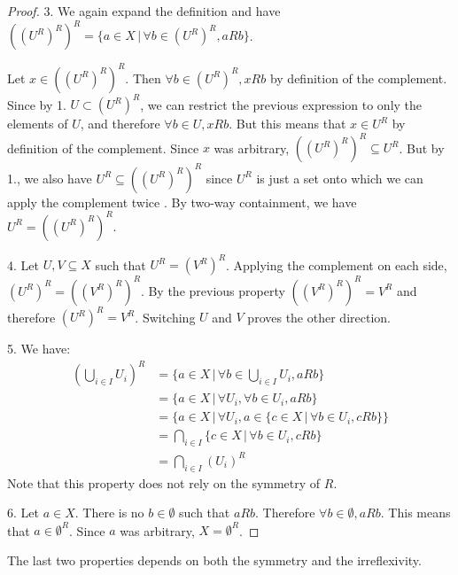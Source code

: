 \begin{mathSection}
\begin{proof}
		3. We again expand the definition and have $((U^{R})^{R})^{R} = \{ a \in X \, | \, \forall b \in (U^{R})^{R}, aRb \}$.
		
		Let $x \in ((U^{R})^{R})^{R}$. Then $\forall b \in (U^{R})^{R}, xRb$ by definition of the complement. Since by 1. $U \subset (U^{R})^{R}$, we can restrict the previous expression to only the elements of $U$, and therefore $\forall b \in U, xRb$. But this means that $x \in U^{R}$ by definition of the complement. Since $x$ was arbitrary, $((U^{R})^{R})^{R} \subseteq U^{R}$. But by 1., we also have $U^{R} \subseteq ((U^{R})^{R})^{R}$ since $U^{R}$ is just a set onto which we can apply the complement twice . By two-way containment, we have $U^{R} = ((U^{R})^{R})^{R}$.
		
		4. Let $U, V \subseteq X$ such that $U^{R} = (V^{R})^{R}$. Applying the complement on each side, $(U^{R})^{R} = ((V^{R})^{R})^{R}$. By the previous property $((V^{R})^{R})^{R} = V^{R}$ and therefore $(U^{R})^{R} = V^{R}$. Switching $U$ and $V$ proves the other direction.
		
		5. We have:
		\begin{equation*}
			\begin{aligned}
				(\bigcup_{i \in I} U_i )^{R} &= \{ a \in X \, | \, \forall b \in \bigcup_{i \in I} U_i, aRb \} \\
				&= \{ a \in X \, | \, \forall U_i, \forall  b \in U_i, aRb \} \\
				&= \{ a \in X \, | \, \forall U_i, a \in \{ c \in X \, | \,  \forall  b \in U_i, cRb \} \} \\
				&= \bigcap_{i \in I} \{ c \in X \, | \, \forall  b \in U_i, cRb\} \\
				&= \bigcap_{i \in I} (U_i)^{R}
			\end{aligned}
		\end{equation*}
		Note that this property does not rely on the symmetry of $R$.
		
		6. Let $a \in X$. There is no $b \in \emptyset$ such that $aRb$. Therefore $\forall b \in \emptyset, aRb$. This means that $a \in \emptyset^{R}$. Since $a$ was arbitrary, $X = \emptyset^{R}$.
	\end{proof}
\end{mathSection}

The last two properties depends on both the symmetry and the irreflexivity.

